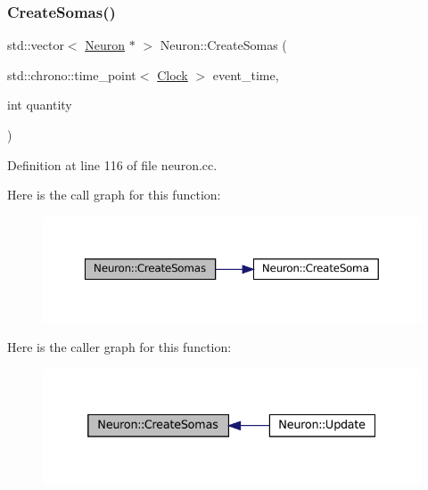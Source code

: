 \subsubsection{\texorpdfstring{Create\+Somas()}{CreateSomas()}}
{\footnotesize\ttfamily std\+::vector$<$ \mbox{\hyperlink{class_neuron}{Neuron}} $\ast$ $>$ Neuron\+::\+Create\+Somas (\begin{DoxyParamCaption}\item[{std\+::chrono\+::time\+\_\+point$<$ \mbox{\hyperlink{universe_8h_a0ef8d951d1ca5ab3cfaf7ab4c7a6fd80}{Clock}} $>$}]{event\+\_\+time,  }\item[{int}]{quantity }\end{DoxyParamCaption})}



Definition at line 116 of file neuron.\+cc.

Here is the call graph for this function\+:\nopagebreak
\begin{figure}[H]
\begin{center}
\leavevmode
\includegraphics[width=350pt]{class_neuron_a2016d83b02bfe9e5548d5c24ef31dded_cgraph}
\end{center}
\end{figure}
Here is the caller graph for this function\+:\nopagebreak
\begin{figure}[H]
\begin{center}
\leavevmode
\includegraphics[width=332pt]{class_neuron_a2016d83b02bfe9e5548d5c24ef31dded_icgraph}
\end{center}
\end{figure}
\mbox{\label{class_neuron_a127d1b915e976c63e731a94b7d27e0b1}} 
